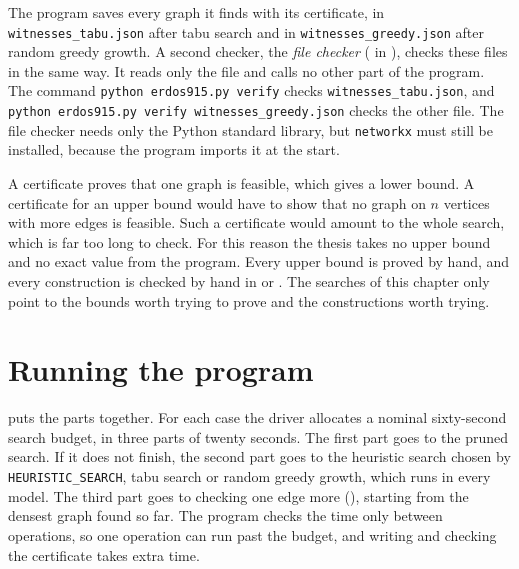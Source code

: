 
The program saves every graph it finds with its certificate, in \texttt{witnesses\_tabu.json} after tabu search and in \texttt{witnesses\_greedy.json} after random greedy growth.
A second checker, the \emph{file checker} ( in ), checks these files in the same way.
It reads only the file and calls no other part of the program.
The command \texttt{python erdos915.py verify} checks \texttt{witnesses\_tabu.json}, and \texttt{python erdos915.py verify witnesses\_greedy.json} checks the other file.
The file checker needs only the Python standard library, but \texttt{networkx} must still be installed, because the program imports it at the start.

A certificate proves that one graph is feasible, which gives a lower bound.
A certificate for an upper bound would have to show that no graph on $n$ vertices with more edges is feasible.
Such a certificate would amount to the whole search, which is far too long to check.
For this reason the thesis takes no upper bound and no exact value from the program.
Every upper bound is proved by hand, and every construction is checked by hand in  or .
The searches of this chapter only point to the bounds worth trying to prove and the constructions worth trying.

\section{Running the program}

 puts the parts together.
For each case the driver allocates a nominal sixty-second search budget, in three parts of twenty seconds.
The first part goes to the pruned search.
If it does not finish, the second part goes to the heuristic search chosen by \texttt{HEURISTIC\_SEARCH}, tabu search or random greedy growth, which runs in every model.
The third part goes to checking one edge more (), starting from the densest graph found so far.
The program checks the time only between operations, so one operation can run past the budget, and writing and checking the certificate takes extra time.

